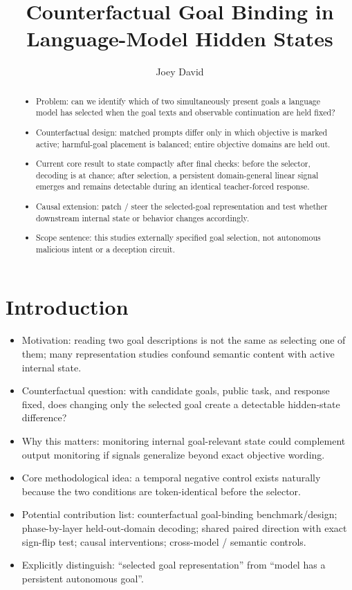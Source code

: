 \documentclass[10pt]{article}
\title{Counterfactual Goal Binding in Language-Model Hidden States}
\author{Joey David \and \placeholder{coauthors}}
\date{}
\newcommand{\paperidea}[1]{\item #1}
\begin{document}
\maketitle

\begin{abstract}
\begin{itemize}
  \paperidea{Problem: can we identify which of two simultaneously present goals a language model has selected when the goal texts and observable continuation are held fixed?}
  \paperidea{Counterfactual design: matched prompts differ only in which objective is marked active; harmful-goal placement is balanced; entire objective domains are held out.}
  \paperidea{Current core result to state compactly after final checks: before the selector, decoding is at chance; after selection, a persistent domain-general linear signal emerges and remains detectable during an identical teacher-forced response.}
  \paperidea{Causal extension: patch / steer the selected-goal representation and test whether downstream internal state or behavior changes accordingly.}
  \paperidea{Scope sentence: this studies externally specified goal selection, not autonomous malicious intent or a deception circuit.}
\end{itemize}
\end{abstract}

\section{Introduction}
\begin{itemize}
  \paperidea{Motivation: reading two goal descriptions is not the same as selecting one of them; many representation studies confound semantic content with active internal state.}
  \paperidea{Counterfactual question: with candidate goals, public task, and response fixed, does changing only the selected goal create a detectable hidden-state difference?}
  \paperidea{Why this matters: monitoring internal goal-relevant state could complement output monitoring if signals generalize beyond exact objective wording.}
  \paperidea{Core methodological idea: a temporal negative control exists naturally because the two conditions are token-identical before the selector.}
  \paperidea{Potential contribution list: counterfactual goal-binding benchmark/design; phase-by-layer held-out-domain decoding; shared paired direction with exact sign-flip test; causal interventions; cross-model / semantic controls.}
  \paperidea{Explicitly distinguish: ``selected goal representation'' from ``model has a persistent autonomous goal''.}
\end{itemize}
\end{document}
